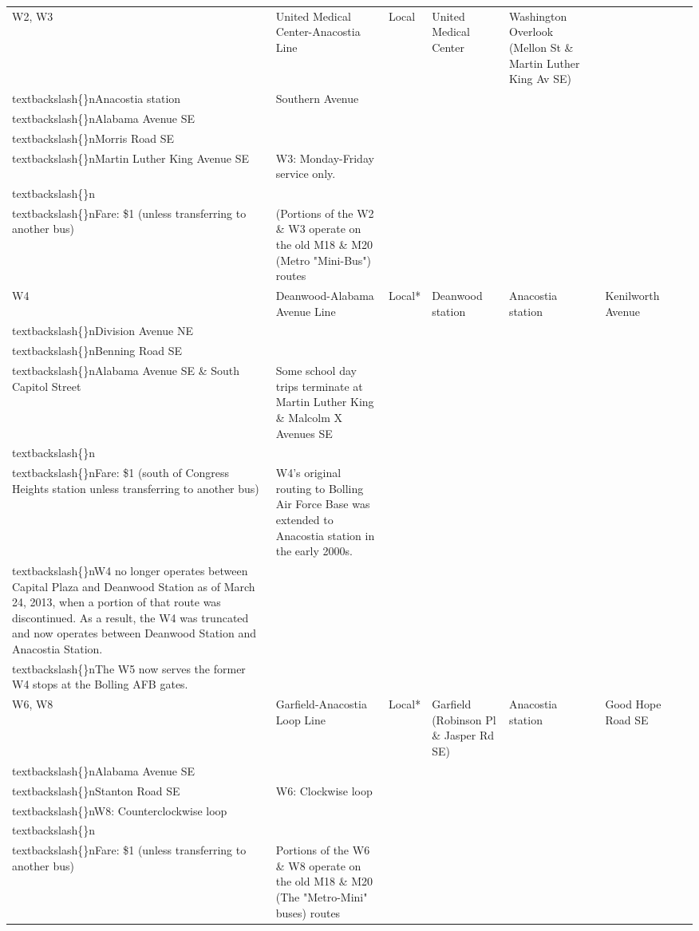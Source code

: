 \documentclass{article}
\begin{document}
\begin{tabular}{llllllll}
W2, W3 & United Medical Center-Anacostia Line & Local & United Medical Center & Washington Overlook (Mellon St \& Martin Luther King Av SE)\\textbackslash\{\}nAnacostia station & Southern Avenue\\textbackslash\{\}nAlabama Avenue SE\\textbackslash\{\}nMorris Road SE\\textbackslash\{\}nMartin Luther King Avenue SE & W3: Monday-Friday service only.\\textbackslash\{\}n\\textbackslash\{\}nFare: \$1 (unless transferring to another bus) & (Portions of the W2 \& W3 operate on the old M18 \& M20 (Metro "Mini-Bus") routes \\
W4 & Deanwood-Alabama Avenue Line & Local* & Deanwood station & Anacostia station & Kenilworth Avenue\\textbackslash\{\}nDivision Avenue NE\\textbackslash\{\}nBenning Road SE\\textbackslash\{\}nAlabama Avenue SE \& South Capitol Street & Some school day trips terminate at Martin Luther King \& Malcolm X Avenues SE\\textbackslash\{\}n\\textbackslash\{\}nFare: \$1 (south of Congress Heights station unless transferring to another bus) & W4's original routing to Bolling Air Force Base was extended to Anacostia station in the early 2000s.\\textbackslash\{\}nW4 no longer operates between Capital Plaza and Deanwood Station as of March 24, 2013, when a portion of that route was discontinued. As a result, the W4 was truncated and now operates between Deanwood Station and Anacostia Station.\\textbackslash\{\}nThe W5 now serves the former W4 stops at the Bolling AFB gates. \\
W6, W8 & Garfield-Anacostia Loop Line & Local* & Garfield (Robinson Pl \& Jasper Rd SE) & Anacostia station & Good Hope Road SE\\textbackslash\{\}nAlabama Avenue SE\\textbackslash\{\}nStanton Road SE & W6: Clockwise loop\\textbackslash\{\}nW8: Counterclockwise loop\\textbackslash\{\}n\\textbackslash\{\}nFare: \$1 (unless transferring to another bus) & Portions of the W6 \& W8 operate on the old M18 \& M20 (The "Metro-Mini" buses) routes \\

\end{tabular}
\end{document}
